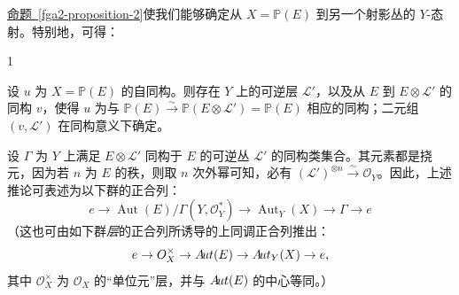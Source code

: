 \par{}\hyperref[fga2-proposition-2]{命题~\ref*{fga2-proposition-2}}使我们能够确定从 \(X=\mathbb {P}(E)\) 到另一个射影丛的 \(Y\)-态射。特别地，可得：
\begin{corollary}{1}\label{fga2-proposition-2-corollary-1}\skipsinglepar
\par{}设 \(u\) 为 \(X=\mathbb {P}(E)\) 的自同构。则存在 \(Y\) 上的可逆层 \(\mathscr {L}'\)，以及从 \(E\) 到 \(E\otimes \mathscr {L}'\) 的同构 \(v\)，使得 \(u\) 为与 \(\mathbb {P}(E)\xrightarrow {\sim }\mathbb {P}(E\otimes \mathscr {L}')=\mathbb {P}(E)\) 相应的同构；二元组 \((v,\mathscr {L}')\) 在同构意义下确定。\end{corollary}
\par{}设 \(\Gamma \) 为 \(Y\) 上满足 \(E\otimes \mathscr {L}'\) 同构于 \(E\) 的可逆丛 \(\mathscr {L}'\) 的同构类集合。其元素都是挠元，因为若 \(n\) 为 \(E\) 的秩，则取 \(n\) 次外幂可知，必有 \((\mathscr {L}')^{\otimes  n}\xrightarrow {\sim }\mathcal {O}_Y\)。因此，上述推论可表述为以下群的正合列：\[     e \to  \operatorname {Aut}(E)/\Gamma (Y,\mathcal {O}_Y^*) \to  \operatorname {Aut}_Y(X) \to  \Gamma  \to  e   \] （这也可由如下群\emph{层}的正合列所诱导的上同调正合列推出：\[     e \to  \mathcal {O}_X^\times  \to  \mathscr {A}\kern  -1.75pt\mathit {ut}(E) \to  \mathscr {A}\kern  -1.75pt\mathit {ut}_Y(X) \to  e,   \] 其中 \(\mathcal {O}_X^\times \) 为 \(\mathcal {O}_X\) 的“单位元”层，并与 \(\mathscr {A}\kern  -1.75pt\mathit {ut}(E)\) 的中心等同。）
